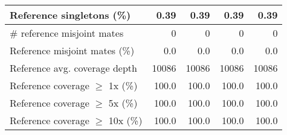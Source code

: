 \documentclass[12pt,a4paper]{article}
\begin{document}
\begin{table}[ht]
\begin{center}
\begin{tabular}{|l*{4}{|r}|}
Reference singletons (\%) & 0.39 & 0.39 & 0.39 & 0.39 \\ \hline
\# reference misjoint mates & 0 & 0 & 0 & 0 \\ \hline
Reference misjoint mates (\%) & 0.0 & 0.0 & 0.0 & 0.0 \\ \hline
Reference avg. coverage depth & 10086 & 10086 & 10086 & 10086 \\ \hline
Reference coverage $\geq$ 1x (\%) & 100.0 & 100.0 & 100.0 & 100.0 \\ \hline
Reference coverage $\geq$ 5x (\%) & 100.0 & 100.0 & 100.0 & 100.0 \\ \hline
Reference coverage $\geq$ 10x (\%) & 100.0 & 100.0 & 100.0 & 100.0 \\ \hline
\end{tabular}
\end{center}
\end{table}
\end{document}
